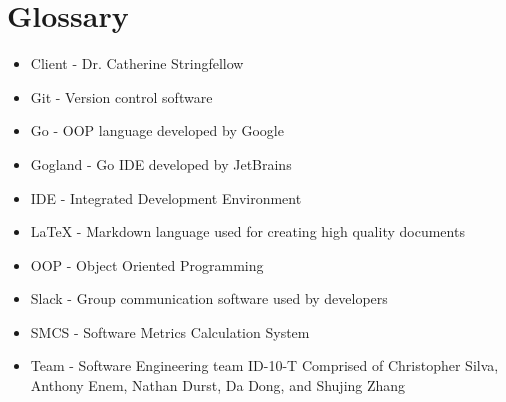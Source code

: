 \documentclass{scrreprt}
\begin{document}
	\chapter{Glossary}
	\begin{itemize}
		\item Client - Dr. Catherine Stringfellow
		\item Git - Version control software
		\item Go - OOP language developed by Google
		\item Gogland - Go IDE developed by JetBrains
		\item IDE - Integrated Development Environment
		\item LaTeX - Markdown language used for creating high quality documents
		\item OOP - Object Oriented Programming
		\item Slack - Group communication software used by developers
		\item SMCS - Software Metrics Calculation System
		\item Team - Software Engineering team ID-10-T Comprised of Christopher Silva, Anthony Enem, Nathan Durst, Da Dong, and Shujing Zhang
	\end{itemize}
\end{document}
